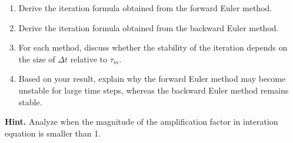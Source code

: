 \documentclass{article}
\begin{document}
\begin{enumerate}
    \item Derive the iteration formula obtained from the forward Euler method.
    \item Derive the iteration formula obtained from the backward Euler method.
    \item For each method, discuss whether the stability of the iteration depends on the size of $\Delta t$ relative to $\tau_m$.
    \item Based on your result, explain why the forward Euler method may become unstable for large time steps, whereas the backward Euler method remains stable.
\end{enumerate}

\noindent\textbf{Hint.}
Analyze when the magnitude of the amplification factor in interation equation is smaller than 1.
\end{document}
